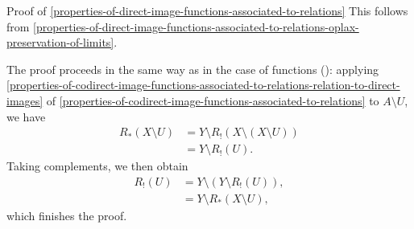 \begin{Proof}{Proof of \cref{properties-of-direct-image-functions-associated-to-relations}}
    This follows from \cref{properties-of-direct-image-functions-associated-to-relations-oplax-preservation-of-limits}.

    The proof proceeds in the same way as in the case of functions (): applying \cref{properties-of-codirect-image-functions-associated-to-relations-relation-to-direct-images} of \cref{properties-of-codirect-image-functions-associated-to-relations} to $A\setminus U$, we have
    \begin{align*}
        R_{*}(X\setminus U) &= Y\setminus R_{!}(X\setminus(X\setminus U))\\
                            &= Y\setminus R_{!}(U).
    \end{align*}
    Taking complements, we then obtain
    \begin{align*}
        R_{!}(U) &= Y\setminus(Y\setminus R_{!}(U)),\\
                 &= Y\setminus R_{*}(X\setminus U),
    \end{align*}
    which finishes the proof.
\end{Proof}
